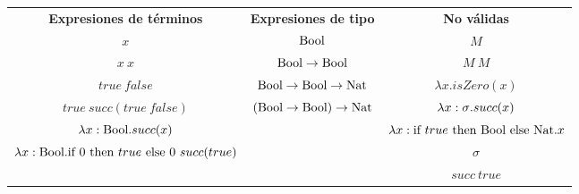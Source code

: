 \documentclass[10pt,a4paper, landscape]{article}
\begin{document}
\vspace*{5mm}
\begin{center}
    \begin{tabular}{c|c|c}
        \textbf{Expresiones de términos} & \textbf{Expresiones de tipo} & \textbf{No válidas}\\
       $x$ & $\text{Bool}$ & $M$ \\ 
       $x~x$ & $\text{Bool}\to \text{Bool}$ & $M~M$ \\      
       $true~false$ & $\text{Bool}\to \text{Bool}\to \text{Nat}$ & $\lambda x.isZero(x)$ \\
       $true~succ(true~false)$ & $(\text{Bool}\to \text{Bool})\to \text{Nat}$ & ${\lambda x: \sigma \text{.} succ(x)}$\\
       $\lambda x: \text{Bool} \text{.} succ(x)$ & & $\lambda x:\text{if } true \text{ then } \text{Bool} \text{ else } \text{Nat}.x$ \\
       $\lambda x: \text{Bool} \text{.} \text{if } 0 \text{ then } true \text{ else } 0~succ(true)$ & & $\sigma$ \\
       & & $succ~true$
    \end{tabular}
\end{center}
\vspace*{\fill}
\end{document}
